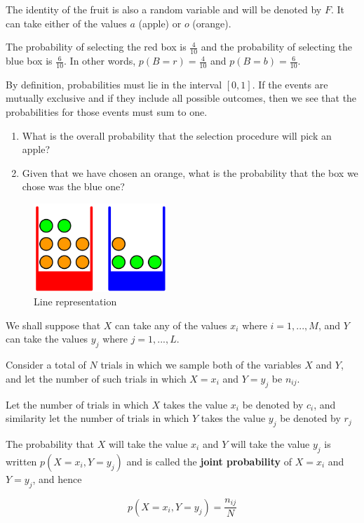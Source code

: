 The identity of the fruit is also a random variable and will be denoted by $F$.  It can take either of the values $a$ (apple) or $o$ (orange).

The probability of selecting the red box is $\frac{4}{10}$ and the probability of selecting the blue box is $\frac{6}{10}$. In other words, $p(B = r) = \frac{4}{10}$ and $p(B = b) = \frac{6}{10}$.

By definition, probabilities must lie in the interval $[0, 1]$. If the events are mutually exclusive and if they include all possible outcomes, then we see that the probabilities for those events must sum to one.

\begin{enumerate}
    \item What is the overall probability that the selection procedure will pick an apple?
    \item Given that we have chosen an orange, what is the probability that the box we chose was the blue one?
\end{enumerate}

\begin{figure}
    \centering
    \includegraphics[width=5cm]{chapter008/figures/fig001.png}
    \caption{Line representation}
\end{figure}

We shall suppose that $X$ can take any of the values $x_i$ where $i = 1, ..., M$, and $Y$ can take the values $y_j$ where $j=1, ..., L$.

Consider a total of $N$ trials in which we sample both of the variables $X$ and $Y$, and let the number of such trials in which $X=x_i$ and $Y = y_j$ be $n_{ij}$.

Let the number of trials in which $X$ takes the value $x_i$ be denoted by $c_i$, and similarity let the number of trials in which $Y$ takes the value $y_j$ be denoted by $r_j$

The probability that $X$ will take the value $x_i$ and $Y$ will take the value $y_j$ is written $p(X = x_i, Y = y_j)$ and is called the \textbf{joint probability} of $X = x_i$ and $Y = y_j$, and hence

\begin{equation}
    p(X = x_i, Y = y_j) = \frac{n_{ij}}{N}
\end{equation}

